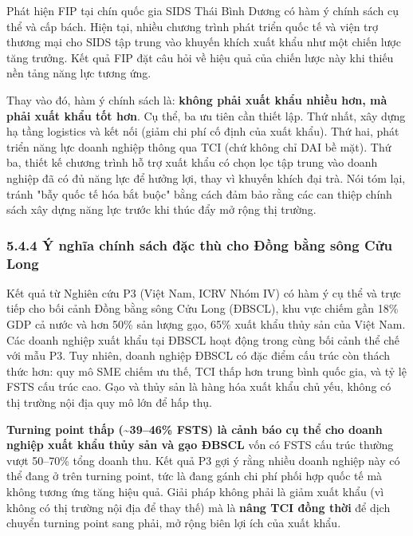 \documentclass[12pt,a4paper]{article}
\begin{document}
Phát hiện FIP tại chín quốc gia SIDS Thái Bình Dương có hàm ý chính sách
cụ thể và cấp bách. Hiện tại, nhiều chương trình phát triển quốc tế và
viện trợ thương mại cho SIDS tập trung vào khuyến khích xuất khẩu như
một chiến lược tăng trưởng. Kết quả FIP đặt câu hỏi về hiệu quả của
chiến lược này khi thiếu nền tảng năng lực tương ứng.

Thay vào đó, hàm ý chính sách là: \textbf{không phải xuất khẩu nhiều
hơn, mà phải xuất khẩu tốt hơn}. Cụ thể, ba ưu tiên cần thiết lập. Thứ
nhất, xây dựng hạ tầng logistics và kết nối (giảm chi phí cố định của
xuất khẩu). Thứ hai, phát triển năng lực doanh nghiệp thông qua TCI (chứ
không chỉ DAI bề mặt). Thứ ba, thiết kế chương trình hỗ trợ xuất khẩu có
chọn lọc tập trung vào doanh nghiệp đã có đủ năng lực để hưởng lợi, thay
vì khuyến khích đại trà. Nói tóm lại, tránh "bẫy quốc tế hóa bắt buộc"
bằng cách đảm bảo rằng các can thiệp chính sách xây dựng năng lực trước
khi thúc đẩy mở rộng thị trường.

\hypertarget{544-uxfd-nghux129a-chuxednh-suxe1ch-ux111ux1eb7c-thuxf9-cho-ux111ux1ed3ng-bux1eb1ng-suxf4ng-cux1eedu-long}{%
\subsubsection{5.4.4 Ý nghĩa chính sách đặc thù cho Đồng bằng sông Cửu
Long}\label{544-uxfd-nghux129a-chuxednh-suxe1ch-ux111ux1eb7c-thuxf9-cho-ux111ux1ed3ng-bux1eb1ng-suxf4ng-cux1eedu-long}}

Kết quả từ Nghiên cứu P3 (Việt Nam, ICRV Nhóm IV) có hàm ý cụ thể và
trực tiếp cho bối cảnh Đồng bằng sông Cửu Long (ĐBSCL), khu vực chiếm
gần 18\% GDP cả nước và hơn 50\% sản lượng gạo, 65\% xuất khẩu thủy sản
của Việt Nam. Các doanh nghiệp xuất khẩu tại ĐBSCL hoạt động trong cùng
bối cảnh thể chế với mẫu P3. Tuy nhiên, doanh nghiệp ĐBSCL có đặc điểm
cấu trúc còn thách thức hơn: quy mô SME chiếm ưu thế, TCI thấp hơn trung
bình quốc gia, và tỷ lệ FSTS cấu trúc cao. Gạo và thủy sản là hàng hóa
xuất khẩu chủ yếu, không có thị trường nội địa quy mô lớn để hấp thụ.

\textbf{Turning point thấp (\textasciitilde39--46\% FSTS) là cảnh báo cụ
thể cho doanh nghiệp xuất khẩu thủy sản và gạo ĐBSCL} vốn có FSTS cấu
trúc thường vượt 50--70\% tổng doanh thu. Kết quả P3 gợi ý rằng nhiều
doanh nghiệp này có thể đang ở trên turning point, tức là đang gánh chi
phí phối hợp quốc tế mà không tương ứng tăng hiệu quả. Giải pháp không
phải là giảm xuất khẩu (vì không có thị trường nội địa để thay thế) mà
là \textbf{nâng TCI đồng thời} để dịch chuyển turning point sang phải,
mở rộng biên lợi ích của xuất khẩu.
\end{document}
